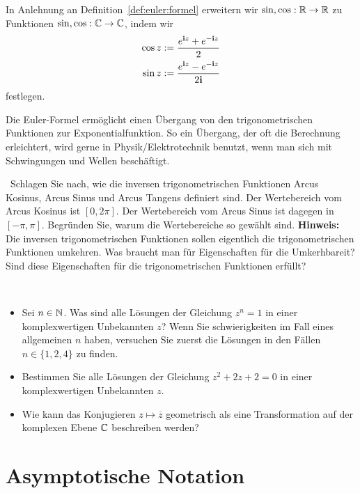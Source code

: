 \begin{defn} 
	In Anlehnung an Definition~\ref{def:euler:formel} erweitern wir $\sin, \cos : \mathbb{R} \to \mathbb{R}$ zu Funktionen $\sin, \cos : \mathbb{C} \to \mathbb{C}$, indem wir 
	\begin{align*}
			\cos z  & : = \frac{e^{\mathbf{i} z} + e^{-\mathbf{i} z}}{2}
			\\ \sin z & := \frac{e^{\mathbf{i} z } - e^{ -\mathbf{i} z}}{2 \mathbf{i}}
	\end{align*} 
	festlegen. 
\end{defn} 

\begin{bem}
	Die Euler-Formel ermöglicht einen Übergang von den trigonometrischen Funktionen zur Exponentialfunktion. So ein Übergang, der oft die Berechnung  erleichtert, wird gerne in Physik/Elektrotechnik benutzt, wenn man sich mit Schwingungen und Wellen beschäftigt. 
\end{bem} 

\begin{aufg}\ 
	Schlagen Sie nach, wie die inversen trigonometrischen Funktionen Arcus Kosinus, Arcus Sinus und Arcus Tangens definiert sind. Der Wertebereich  vom Arcus Kosinus ist $[0,2\pi]$. Der Wertebereich vom Arcus Sinus ist dagegen in $[-\pi,\pi]$. Begründen Sie, warum die Wertebereiche so gewählt sind. \textbf{Hinweis:} Die inversen trigonometrischen Funktionen sollen eigentlich die trigonometrischen Funktionen umkehren. Was braucht man für Eigenschaften für die Umkerhbareit? Sind diese Eigenschaften für die trigonometrischen Funktionen erfüllt? 
\end{aufg} 

\begin{aufg}\
	\begin{itemize}
			\item Sei $n \in \mathbb{N}$. Was sind alle Lösungen der Gleichung $z^n =1$ in einer komplexwertigen Unbekannten $z$? Wenn Sie schwierigkeiten im Fall eines allgemeinen $n$ haben, versuchen Sie zuerst die Lösungen in den Fällen $n \in \{1,2,4\}$ zu finden. 
			\item Bestimmen Sie alle Lösungen der Gleichung $z^2 + 2 z +  2 = 0$ in einer komplexwertigen Unbekannten $z$. 
			\item Wie kann das Konjugieren $z \mapsto \overline{z}$ geometrisch als eine Transformation  auf der komplexen Ebene $\mathbb{C}$ beschreiben werden? 
	\end{itemize} 
\end{aufg} 


\section{Asymptotische Notation}

